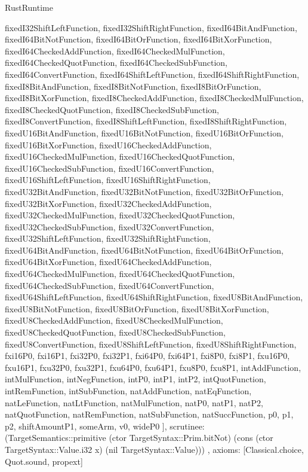 \begin{lexlean}{RustRuntime}
\begin{semanticmodule}
{{      fixedI32ShiftLeftFunction,
      fixedI32ShiftRightFunction,
      fixedI64BitAndFunction,
      fixedI64BitNotFunction,
      fixedI64BitOrFunction,
      fixedI64BitXorFunction,
      fixedI64CheckedAddFunction,
      fixedI64CheckedMulFunction,
      fixedI64CheckedQuotFunction,
      fixedI64CheckedSubFunction,
      fixedI64ConvertFunction,
      fixedI64ShiftLeftFunction,
      fixedI64ShiftRightFunction,
      fixedI8BitAndFunction,
      fixedI8BitNotFunction,
      fixedI8BitOrFunction,
      fixedI8BitXorFunction,
      fixedI8CheckedAddFunction,
      fixedI8CheckedMulFunction,
      fixedI8CheckedQuotFunction,
      fixedI8CheckedSubFunction,
      fixedI8ConvertFunction,
      fixedI8ShiftLeftFunction,
      fixedI8ShiftRightFunction,
      fixedU16BitAndFunction,
      fixedU16BitNotFunction,
      fixedU16BitOrFunction,
      fixedU16BitXorFunction,
      fixedU16CheckedAddFunction,
      fixedU16CheckedMulFunction,
      fixedU16CheckedQuotFunction,
      fixedU16CheckedSubFunction,
      fixedU16ConvertFunction,
      fixedU16ShiftLeftFunction,
      fixedU16ShiftRightFunction,
      fixedU32BitAndFunction,
      fixedU32BitNotFunction,
      fixedU32BitOrFunction,
      fixedU32BitXorFunction,
      fixedU32CheckedAddFunction,
      fixedU32CheckedMulFunction,
      fixedU32CheckedQuotFunction,
      fixedU32CheckedSubFunction,
      fixedU32ConvertFunction,
      fixedU32ShiftLeftFunction,
      fixedU32ShiftRightFunction,
      fixedU64BitAndFunction,
      fixedU64BitNotFunction,
      fixedU64BitOrFunction,
      fixedU64BitXorFunction,
      fixedU64CheckedAddFunction,
      fixedU64CheckedMulFunction,
      fixedU64CheckedQuotFunction,
      fixedU64CheckedSubFunction,
      fixedU64ConvertFunction,
      fixedU64ShiftLeftFunction,
      fixedU64ShiftRightFunction,
      fixedU8BitAndFunction,
      fixedU8BitNotFunction,
      fixedU8BitOrFunction,
      fixedU8BitXorFunction,
      fixedU8CheckedAddFunction,
      fixedU8CheckedMulFunction,
      fixedU8CheckedQuotFunction,
      fixedU8CheckedSubFunction,
      fixedU8ConvertFunction,
      fixedU8ShiftLeftFunction,
      fixedU8ShiftRightFunction,
      fxi16P0,
      fxi16P1,
      fxi32P0,
      fxi32P1,
      fxi64P0,
      fxi64P1,
      fxi8P0,
      fxi8P1,
      fxu16P0,
      fxu16P1,
      fxu32P0,
      fxu32P1,
      fxu64P0,
      fxu64P1,
      fxu8P0,
      fxu8P1,
      intAddFunction,
      intMulFunction,
      intNegFunction,
      intP0,
      intP1,
      intP2,
      intQuotFunction,
      intRemFunction,
      intSubFunction,
      natAddFunction,
      natEqFunction,
      natLeFunction,
      natLtFunction,
      natMulFunction,
      natP0,
      natP1,
      natP2,
      natQuotFunction,
      natRemFunction,
      natSubFunction,
      natSuccFunction,
      p0,
      p1,
      p2,
      shiftAmountP1,
      someArm,
      v0,
      wideP0
    ],
    scrutinee: (TargetSemantics::primitive (ctor TargetSyntax::Prim.bitNot) (cons (ctor TargetSyntax::Value.i32 x) (nil TargetSyntax::Value)))
  },
  axioms: [Classical.choice, Quot.sound, propext]
}


\end{semanticmodule}
\end{lexlean}
